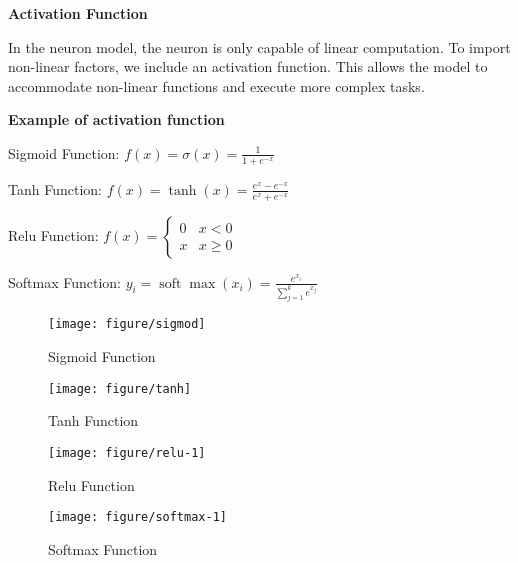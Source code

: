 \documentclass{article}
\begin{document}
    \hspace*{\fill}
    \begin{mdframed}[hidealllines=false,backgroundcolor=white!20]
    \textbf{Activation Function}

    In the neuron model, the neuron is only capable of linear computation. To import non-linear factors, we include an activation function. This allows the model to accommodate non-linear functions and execute more complex tasks.

    \textbf{ Example of activation function}


        \hspace*{\fill}

        Sigmoid Function:
        $f(x)=\sigma(x)=\frac{1}{1+e^{-x}}$
        \hspace*{\fill}


        \hspace*{\fill}

        Tanh Function:
        $f(x)=\tanh (x)=\frac{e^x-e^{-x}}{e^x+e^{-x}}$
        \hspace*{\fill}

        \hspace*{\fill}

        Relu Function:
        $f(x)= \begin{cases}0 & x<0 \\ x & x \geq 0\end{cases}$
        \hspace*{\fill}

        \hspace*{\fill}

        Softmax Function:
        $y_i=\operatorname{soft} \max \left(x_i\right)=\frac{e^{x_i}}{\sum_{j=1}^k e^{x_j}}$
        \hspace*{\fill}


    \end{mdframed}




    \begin{figure}[htbp]
    \centering
    \begin{minipage}[t]{0.48\textwidth}
    \centering
    \texttt{[image: figure/sigmod]}
    \caption{Sigmoid Function}
    \end{minipage}
    \begin{minipage}[t]{0.48\textwidth}
    \centering
    \texttt{[image: figure/tanh]}
    \caption{Tanh Function}
    \end{minipage}

    \centering
    \begin{minipage}[t]{0.48\textwidth}
    \centering
    \texttt{[image: figure/relu-1]}
    \caption{Relu Function}
    \end{minipage}
    \begin{minipage}[t]{0.48\textwidth}
    \centering
    \texttt{[image: figure/softmax-1]}
    \caption{Softmax Function}
    \end{minipage}
    \end{figure}
\end{document}
